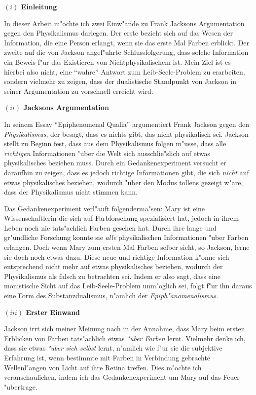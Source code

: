 \documentclass[a4paper, emulatestandardclasses, 12pt]{scrartcl}
\begin{document}
\begin{onehalfspace} 


\noindent\textbf{$(i)$ Einleitung}

\noindent In dieser Arbeit m"ochte ich zwei Einw"ande zu Frank Jacksons Argumentation gegen den Physikalismus darlegen. Der erste bezieht sich auf das Wesen der Information, die eine Person erlangt, wenn sie das erste Mal Farben erblickt. Der zweite auf die von Jackson angef"uhrte Schlussfolgerung, dass solche Information ein Beweis f"ur das Existieren von Nichtphysikalischem ist. Mein Ziel ist es hierbei also nicht, eine "`wahre"' Antwort zum Leib-Seele-Problem zu erarbeiten, sondern vielmehr zu zeigen, dass der dualistische Standpunkt von Jackson in seiner Argumentation zu vorschnell erreicht wird.
\vspace{5mm}

\noindent\textbf{$(ii)$ Jacksons Argumentation}

\noindent In seinem Essay "`Epiphenomenal Qualia"' \citep{jackson1982epiphenomenal} argumentiert Frank Jackson gegen den \emph{Physikalismus}, der besagt, dass es nichts gibt, das nicht physikalisch sei. Jackson stellt zu Beginn fest, dass aus dem Physikalismus folgen m"usse, dass alle \emph{richtigen} Informationen "uber die Welt sich ausschlie"slich auf etwas physikalisches beziehen muss. Durch ein Gedankenexperiment versucht er daraufhin zu zeigen, dass es jedoch richtige Informationen gibt, die sich \emph{nicht} auf etwas physikalisches beziehen, wodurch "uber den Modus tollens gezeigt w"are, dass der Physikalismus nicht stimmen kann. 

Das Gedankenexperiment verl"auft folgenderma"sen: Mary ist eine Wissenschaftlerin die sich auf Farbforschung spezialisiert hat, jedoch in ihrem Leben noch nie tats"achlich Farben gesehen hat. Durch ihre lange und gr"undliche Forschung konnte sie \emph{alle} physikalischen Informationen "uber Farben erlangen. Doch wenn Mary zum ersten Mal Farben selber sieht, so Jackson, lerne sie doch noch etwas dazu. Diese neue und richtige Information k"onne sich entsprechend nicht mehr auf etwas physikalisches beziehen, wodurch der Physikalismus als falsch zu betrachten sei. Indem er also sagt, dass eine monistische Sicht auf das Leib-Seele-Problem unm"oglich sei, folgt f"ur ihn daraus eine Form des Substanzdualismus, n"amlich der \emph{Epiph"anomenalismus}.


\vspace{5mm}
\noindent\textbf{$(iii)$ Erster Einwand}

\noindent Jackson irrt sich meiner Meinung nach in der Annahme, dass Mary beim ersten Erblicken von Farben tats"achlich etwas \emph{"uber Farben} lernt. Vielmehr denke ich, dass sie etwas \emph{"uber sich selbst} lernt, n"amlich wie f"ur sie die subjektive Erfahrung ist, wenn bestimmte mit Farben in Verbindung gebrachte Wellenl"angen von Licht auf ihre Retina treffen. Dies m"ochte ich veranschaulichen, indem ich das Gedankenexperiment um Mary auf das Feuer "ubertrage. 


\end{onehalfspace}
\end{document}
